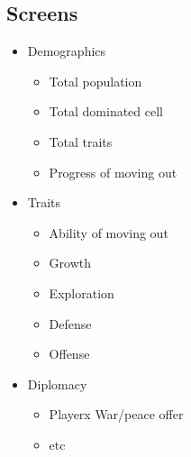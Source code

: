 \documentclass[12pt,a4paper]{article}
\begin{document}
\subsection{Screens}
\begin{itemize}
\item Demographics 
\begin{itemize}
\item Total population
\item Total dominated cell
\item Total traits
\item Progress of moving out
\end{itemize}
\item Traits 
\begin{itemize}
\item Ability of moving out
\item Growth
\item Exploration
\item Defense
\item Offense
\end{itemize}
\item Diplomacy 
\begin{itemize}
\item Playerx \hfill War/peace offer
\item etc
\end{itemize}
\end{itemize}
\end{document}
